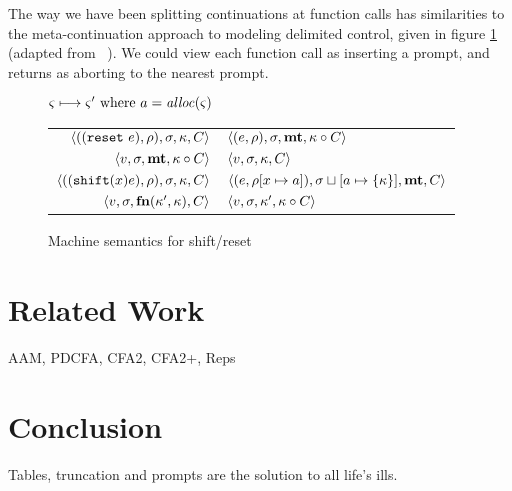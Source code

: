 \documentclass{llncs}
\begin{document}
The way we have been splitting continuations at function calls has
similarities to the meta-continuation approach to modeling delimited
control, given in figure \ref{fig:shift-reset} (adapted from
~\citep{ianjohnson:Biernacki2006274}). We could view each function call
as inserting a prompt, and returns as aborting to the nearest prompt.

\begin{figure}
  \centering
  $\varsigma \longmapsto \varsigma' \text{ where } a = \mathit{alloc}(\varsigma)$ \\
  \begin{tabular}{r|l}
    \hline
    $\langle ((\texttt{reset}\ e), \rho), \sigma, \kappa, C \rangle$
    &
    $\langle (e, \rho), \sigma, \mathbf{mt}, \kappa\circ C \rangle$
    \\
    $\langle v, \sigma, \mathbf{mt}, \kappa\circ C \rangle$
    &
    $\langle v, \sigma, {\kappa}, {C} \rangle$
    \\
    $\langle ((\texttt{shift} (x) e), \rho), \sigma, \kappa, C \rangle$
    &
    $\langle (e, \rho[x \mapsto a]), \sigma\sqcup[a \mapsto \{ \kappa \}],\mathbf{mt},C \rangle$
    \\
    $\langle v,\sigma,\mathbf{fn}{}(\kappa', \kappa), C \rangle$
    &
    $\langle v, \sigma, \kappa', \kappa\circ C \rangle$
  \end{tabular}  
  \caption{Machine semantics for shift/reset}
  \label{fig:shift-reset}
\end{figure}


\section{Related Work}

AAM, PDCFA, CFA2, CFA2+, Reps

\section{Conclusion}

Tables, truncation and prompts are the solution to all life's ills.



\end{document}
